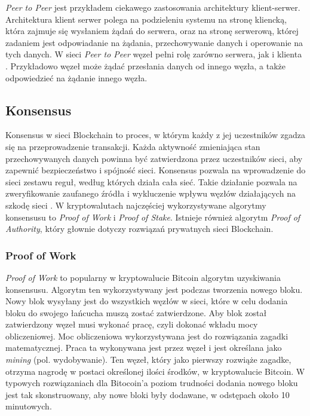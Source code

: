 \documentclass[a4paper,12pt]{book}
\begin{document}
\textit{Peer to Peer} jest przykładem ciekawego zastosowania architektury klient-serwer. Architektura klient serwer polega na podzieleniu systemu na stronę kliencką, która zajmuje się wysłaniem żądań do serwera, oraz na stronę serwerową, której zadaniem jest odpowiadanie na żądania, przechowywanie danych i operowanie na tych danych. W sieci \textit{Peer to Peer} węzeł pełni rolę zarówno serwera, jak i klienta \cite{p2pbib}. 
Przykładowo węzeł może żądać przesłania danych od innego węzła, a także odpowiedzieć na żądanie innego węzła.

\subsection{Konsensus}

Konsensus w sieci Blockchain to proces, w którym każdy z jej uczestników zgadza się na przeprowadzenie transakcji. Każda aktywność zmieniająca stan przechowywanych danych powinna być zatwierdzona przez uczestników sieci, aby zapewnić bezpieczeństwo i spójność sieci. Konsensus pozwala na wprowadzenie do sieci zestawu reguł, według których działa cała sieć. Takie działanie pozwala na zweryfikowanie zaufanego źródła i wykluczenie wpływu węzłów działających na szkodę sieci \cite{piechk}. W kryptowalutach najczęściej wykorzystywane algorytmy konsensusu to \textit{Proof of Work} i \textit{Proof of Stake}. Istnieje również algorytm \textit{Proof of Authority}, który głownie dotyczy rozwiązań prywatnych sieci Blockchain.

\subsubsection{Proof of Work}

\textit{Proof of Work} to popularny w kryptowalucie Bitcoin algorytm uzyskiwania konsensusu. Algorytm ten wykorzystywany jest podczas tworzenia nowego bloku. Nowy blok wysyłany jest do wszystkich węzłów w sieci, które w celu dodania bloku do swojego łańcucha muszą zostać zatwierdzone. Aby blok został zatwierdzony węzeł musi wykonać pracę, czyli dokonać wkładu mocy obliczeniowej. Moc obliczeniowa wykorzystywana jest do rozwiązania zagadki matematycznej. Praca ta wykonywana jest przez węzeł i jest określana jako \textit{mining} (pol. wydobywanie). Ten węzeł, który jako pierwszy rozwiąże zagadke, otrzyma nagrodę w postaci określonej ilości środków, w kryptowalucie Bitcoin. W typowych rozwiązaniach dla Bitocoin'a poziom trudności dodania nowego bloku jest tak skonstruowany, aby nowe bloki były dodawane, w odstępach około 10 minutowych\cite{pow-bitcoin}.
\end{document}

